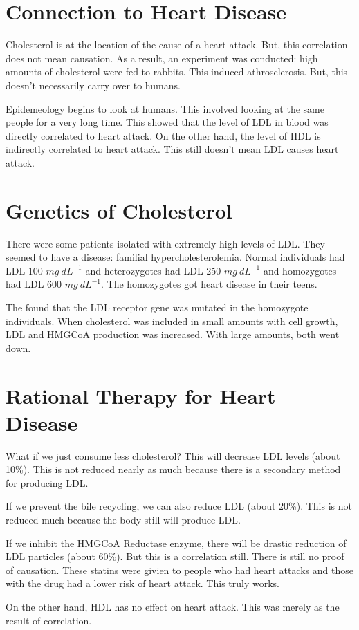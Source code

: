 \documentclass{article}
\begin{document}
\section{ Connection to Heart Disease }

Cholesterol is at the location of the cause of a heart attack. But, this
correlation does not mean causation. As a result, an experiment was conducted:
high amounts of cholesterol were fed to rabbits. This induced athrosclerosis.
But, this doesn't necessarily carry over to humans. 

Epidemeology begins to look at humans. This involved looking at the same people
for a very long time. This showed that the level of LDL in blood was directly
correlated to heart attack. On the other hand, the level of HDL is indirectly
correlated to heart attack. This still doesn't mean LDL causes heart attack. 

\section{ Genetics of Cholesterol }

There were some patients isolated with extremely high levels of LDL. They seemed
to have a disease: familial hypercholesterolemia. Normal individuals had LDL 100
$\si{ mg\ dL^{-1} }$ and heterozygotes had LDL 250 $\si{ mg\ dL^{-1} }$ and
homozygotes had LDL 600 $\si{ mg\ dL^{-1} }$. The homozygotes got heart
disease in their teens. 

The found that the LDL receptor gene was mutated in the homozygote individuals.
When cholesterol was included in small amounts with cell growth, LDL and HMGCoA
production was increased. With large amounts, both went down.

\section{ Rational Therapy for Heart Disease }

What if we just consume less cholesterol? This will decrease LDL levels (about
10\%). This is not reduced nearly as much because there is a secondary method
for producing LDL.

If we prevent the bile recycling, we can also reduce LDL (about 20\%). This is
not reduced much because the body still will produce LDL.

If we inhibit the HMGCoA Reductase enzyme, there will be drastic reduction of
LDL particles (about 60\%). But this is a correlation still. There is still no
proof of causation. These statins were givien to people who had heart attacks
and those with the drug had a lower risk of heart attack. This truly works.

On the other hand, HDL has no effect on heart attack. This was merely as the
result of correlation.
\end{document}
